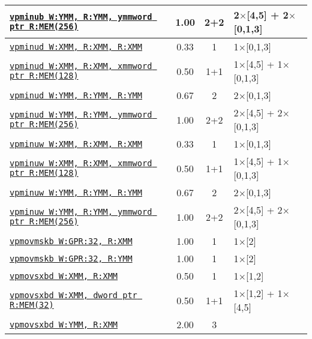 \documentclass[a4paper,english,fontsize=9]{scrartcl}
\begin{document}
\begin{longtable}{p{}ccL{.25\textwidth}}
  \texttt{\href{https://felixcloutier.com/x86/PMINUB:PMINUW.html}{vpminub W:YMM, R:YMM, ymmword ptr R:MEM(256)}} & 1.00 & 2+2 & 2\(\times\)[4,5] + 2\(\times\)[0,1,3] \\
  \midrule
  \texttt{\href{https://felixcloutier.com/x86/PMINUD:PMINUQ.html}{vpminud W:XMM, R:XMM, R:XMM}} & 0.33 & 1 & 1\(\times\)[0,1,3] \\
  \midrule
  \texttt{\href{https://felixcloutier.com/x86/PMINUD:PMINUQ.html}{vpminud W:XMM, R:XMM, xmmword ptr R:MEM(128)}} & 0.50 & 1+1 & 1\(\times\)[4,5] + 1\(\times\)[0,1,3] \\
  \midrule
  \texttt{\href{https://felixcloutier.com/x86/PMINUD:PMINUQ.html}{vpminud W:YMM, R:YMM, R:YMM}} & 0.67 & 2 & 2\(\times\)[0,1,3] \\
  \midrule
  \texttt{\href{https://felixcloutier.com/x86/PMINUD:PMINUQ.html}{vpminud W:YMM, R:YMM, ymmword ptr R:MEM(256)}} & 1.00 & 2+2 & 2\(\times\)[4,5] + 2\(\times\)[0,1,3] \\
  \midrule
  \texttt{\href{https://felixcloutier.com/x86/PMINUB:PMINUW.html}{vpminuw W:XMM, R:XMM, R:XMM}} & 0.33 & 1 & 1\(\times\)[0,1,3] \\
  \midrule
  \texttt{\href{https://felixcloutier.com/x86/PMINUB:PMINUW.html}{vpminuw W:XMM, R:XMM, xmmword ptr R:MEM(128)}} & 0.50 & 1+1 & 1\(\times\)[4,5] + 1\(\times\)[0,1,3] \\
  \midrule
  \texttt{\href{https://felixcloutier.com/x86/PMINUB:PMINUW.html}{vpminuw W:YMM, R:YMM, R:YMM}} & 0.67 & 2 & 2\(\times\)[0,1,3] \\
  \midrule
  \texttt{\href{https://felixcloutier.com/x86/PMINUB:PMINUW.html}{vpminuw W:YMM, R:YMM, ymmword ptr R:MEM(256)}} & 1.00 & 2+2 & 2\(\times\)[4,5] + 2\(\times\)[0,1,3] \\
  \midrule
  \texttt{\href{https://felixcloutier.com/x86/PMOVMSKB.html}{vpmovmskb W:GPR:32, R:XMM}} & 1.00 & 1 & 1\(\times\)[2] \\
  \midrule
  \texttt{\href{https://felixcloutier.com/x86/PMOVMSKB.html}{vpmovmskb W:GPR:32, R:YMM}} & 1.00 & 1 & 1\(\times\)[2] \\
  \midrule
  \texttt{\href{https://felixcloutier.com/x86/PMOVSX.html}{vpmovsxbd W:XMM, R:XMM}} & 0.50 & 1 & 1\(\times\)[1,2] \\
  \midrule
  \texttt{\href{https://felixcloutier.com/x86/PMOVSX.html}{vpmovsxbd W:XMM, dword ptr R:MEM(32)}} & 0.50 & 1+1 & 1\(\times\)[1,2] + 1\(\times\)[4,5] \\
  \midrule
  \texttt{\href{https://felixcloutier.com/x86/PMOVSX.html}{vpmovsxbd W:YMM, R:XMM}} & 2.00 & 3 &  \\

\end{longtable}
\end{document}
